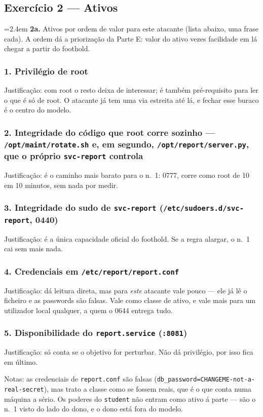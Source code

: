 \documentclass[a4paper,11pt]{article}
\newenvironment{answer}[1]{%
  \par\addvspace{7pt}\noindent
  \hangindent=2.4em\hangafter=1
  {\color{sscnblue}\bfseries #1\hspace{0.55em}}\ignorespaces}
  {\par\addvspace{5pt}}
\newcommand{\cmd}[1]{\textcolor{sscnblue}{\texttt{#1}}}
\begin{document}
\subsection{Exerc\'{i}cio 2 --- Ativos}

\begin{answer}{2a.}
Ativos por ordem de valor para este atacante (lista abaixo, uma frase cada).
A ordem d\'a a prioriza\c{c}\~{a}o da Parte E: valor do ativo vezes facilidade em
l\'a chegar a partir do foothold.

\subsubsection*{1. Privil\'{e}gio de \textbf{root}}
Justifica\c{c}\~{a}o: com root o resto deixa de interessar; \'e tamb\'em pr\'e-requisito para ler o que \'e s\'o de root. O atacante j\'a tem uma via estreita at\'e l\'a, e fechar esse buraco \'e o centro do modelo.

\subsubsection*{2. Integridade do c\'{o}digo que \textbf{root corre sozinho} --- \cmd{/opt/maint/rotate.sh} e, em segundo, \cmd{/opt/report/server.py}, que o pr\'{o}prio \cmd{svc-report} controla}
Justifica\c{c}\~{a}o: \'e o caminho mais barato para o n.\textordmasculine\ 1: 0777, corre como root de 10 em 10 minutos, sem nada por medir.

\subsubsection*{3. Integridade do \textbf{sudo} de \cmd{svc-report} (\cmd{/etc/sudoers.d/svc-report}, 0440)}
Justifica\c{c}\~{a}o: \'e a \'unica capacidade oficial do foothold. Se a regra alargar, o n.\textordmasculine\ 1 cai sem mais nada.

\subsubsection*{4. \textbf{Credenciais em} \cmd{/etc/report/report.conf}}
Justifica\c{c}\~{a}o: d\'a leitura direta, mas para \emph{este} atacante vale pouco --- ele j\'a l\^e o ficheiro e as passwords s\~ao falsas. Vale como classe de ativo, e vale mais para um utilizador local qualquer, a quem o 0644 entrega tudo.

\subsubsection*{5. Disponibilidade do \cmd{report.service} (\cmd{:8081})}
Justifica\c{c}\~{a}o: s\'o conta se o objetivo for perturbar. N\~ao d\'a privil\'egio, por isso fica em \'ultimo.

Notas: as credenciais de \cmd{report.conf} s\~ao falsas
(\cmd{db\_password=CHANGEME-not-a-real-secret}), mas trato a classe como se fossem
reais, que \'e o que conta numa m\'aquina a s\'erio. Os poderes do \cmd{student}
n\~ao entram como ativo \'a parte --- s\~ao o n.\textordmasculine\ 1 visto do lado do
dono, e o dono est\'a fora do modelo.
\end{answer}
\end{document}
